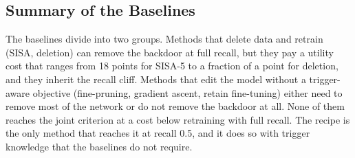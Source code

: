 

\subsection{Summary of the Baselines}
The baselines divide into two groups. Methods that delete data and retrain
(SISA, deletion) can remove the backdoor at full recall, but they pay a utility
cost that ranges from 18 points for SISA-5 to a fraction of a point for deletion,
and they inherit the recall cliff. Methods that edit the model without a
trigger-aware objective (fine-pruning, gradient ascent, retain fine-tuning) either
need to remove most of the network or do not remove the backdoor at all. None of
them reaches the joint criterion at a cost below retraining with full recall. The
recipe is the only method that reaches it at recall 0.5, and it does so with
trigger knowledge that the baselines do not require.
